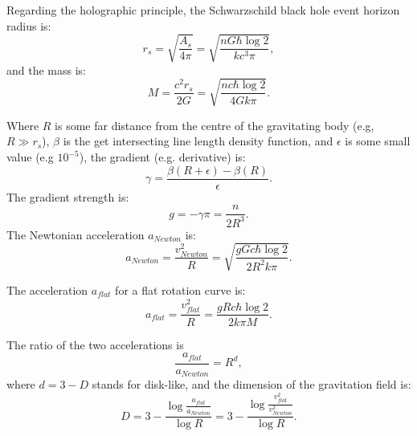 \documentclass[12pt]{article}
\begin{document}
Regarding the holographic principle, the Schwarzschild black hole event horizon radius is:
\begin{equation}
r_s = \sqrt{\frac{A_s}{4 \pi}} = \sqrt{\frac{n G \hbar \log 2}{k c^3 \pi}},
\end{equation}
and the mass is:
\begin{equation}
M = \frac{c^2 r_s}{2 G} = \sqrt{\frac{n c \hbar \log 2}{4 G k \pi}}. 
\end{equation}

Where $R$ is some far distance from the centre of the gravitating body (e.g, $R \gg r_s$), $\beta$ is the get intersecting line length density function, and $\epsilon$ is some small value (e.g $10^{-5}$), the gradient (e.g. derivative) is:
\begin{equation}
\gamma = \frac{\beta(R + \epsilon) - \beta(R)}{\epsilon}.
\end{equation}
The gradient strength is:
\begin{equation}
g = -\gamma \pi = \frac{n}{2 R^3}.
\end{equation}
The Newtonian acceleration $a_{\textit{Newton}}$ is:
\begin{equation}
a_{\textit{Newton}} = \frac{v_{\textit{Newton}}^2}{R} = \sqrt{\frac{g G c \hbar \log 2}{2 R^2 k \pi}}.
\end{equation}

The acceleration $a_{\textit{flat}}$ for a flat rotation curve is:
\begin{equation}
a_{\textit{flat}} = \frac{v_{\textit{flat}}^2}{R} = \frac{g R c \hbar \log 2}{2 k \pi M}.
\end{equation}

The ratio of the two accelerations is
\begin{equation}
\frac{a_{\textit{flat}}}{a_{\textit{Newton}}} = R^{d}, 
\end{equation}
where $d = 3 - D$ stands for disk-like, and the dimension of the gravitation field is:
\begin{equation}
D = 3 - \frac{\log \frac{a_{\textit{flat}}}{a_{\textit{Newton}}}}{\log R} = 3 - \frac{\log \frac{v_{\textit{flat}}^2}{v_{\textit{Newton}}^2}}{\log R}.
\end{equation}
\end{document}
